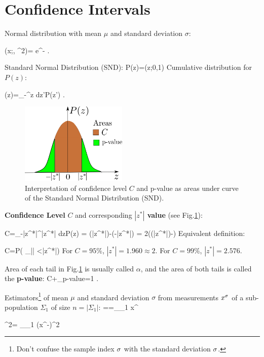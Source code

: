 \section{Confidence Intervals}

Normal distribution
with mean $\mu$
and standard deviation $\sigma$:

\beq
\caln(x;\mu, \s^2)=
e^{-\;}
\;.
\eeq

Standard Normal Distribution (SND):
\beq
P(z)=\caln(z;0,1)
\eeq
Cumulative distribution for $P(z)$:

\beq
\Phi(z)=\int_{-\infty}^z dz'\;P(z')
\;.
\eeq

\begin{figure}[h!]
\centering
\includegraphics[width=2in]
{conventions/conf-int.png}
\caption{
Interpretation
of confidence level $C$
and p-value as areas under curve of the
Standard Normal Distribution (SND).}
\label{fig-conf-int}
\end{figure}

{\bf Confidence Level} $C$
and corresponding {\bf $|z^*|$ value}
(see Fig.\ref{fig-conf-int}):

\beq
C=\int_{-|z^*|}^{|z^*|} dz\;P(z) =
\Phi(|z^*|)-\Phi(-|z^*|)
=
2\left(\Phi(|z^*|)-\;\right)
\label{eq-conf-level1}
\eeq
Equivalent definition:

\beq
C=P\left(
_{|\rvz|}
<|z^*|\right)
\label{eq-conf-level2}
\eeq
For $C=95\%$,
$|z^*|=1.960\approx 2$.
For $C=99\%$, $|z^*|=2.576$.

Area of each tail
in Fig.\ref{fig-conf-int} is
usually called $\alpha$,
and the area of both tails is called
the {\bf p-value}:
\beq
C+\underbrace{2\alpha}_{p-value}=1
\;.
\eeq

Estimators\footnote{Don't
confuse the sample index $\sigma$
with the standard deviation $\sigma$.} of
mean $\mu$  and
standard deviation $\sigma$
from measurements $x^\sigma$
of a sub-population $\Sigma_1$ of
size $n=|\Sigma_1|$:
\beq
\HAT{\mu}==\sum_{\s \in\Sigma_1} x^\s
\eeq

\beq
\HAT{\s}^2=
\sum_{\s\in \Sigma_1} (x^\s-)^2
\eeq


